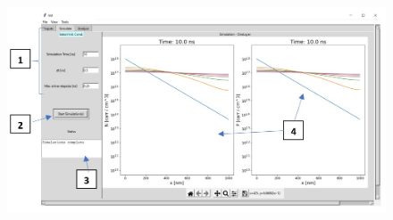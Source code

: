 \documentclass[11pt,letterpaper,titlepage]{article}
\begin{document}
	\begin{figure}[H]
		\label{fig:simulate_overview}
		\centering
		\includegraphics[scale=0.6]{"simulate_overview"}
	\end{figure}
	
\end{document}

